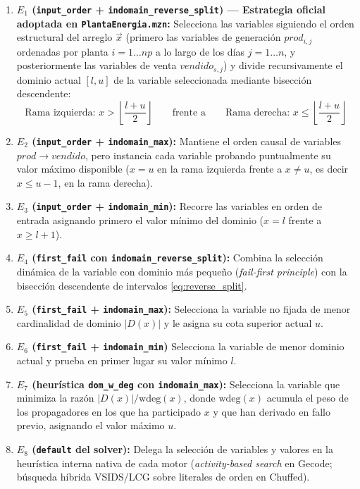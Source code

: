 \begin{enumerate}
    \item \textbf{$E_1$ (\texttt{input\_order} + \texttt{indomain\_reverse\_split}) — Estrategia oficial adoptada en \texttt{PlantaEnergia.mzn}:}
    Selecciona las variables siguiendo el orden estructural del arreglo $\vec{x}$ (primero las variables de generación $prod_{i,j}$ ordenadas por planta $i=1\dots np$ a lo largo de los días $j=1\dots n$, y posteriormente las variables de venta $vendido_{s,j}$) y divide recursivamente el dominio actual $[l, u]$ de la variable seleccionada mediante bisección descendente:
    \begin{equation}
        \text{Rama izquierda: } x > \left\lfloor \frac{l + u}{2} \right\rfloor \qquad \text{frente a} \qquad \text{Rama derecha: } x \le \left\lfloor \frac{l + u}{2} \right\rfloor
        \label{eq:reverse_split}
    \end{equation}

    \item \textbf{$E_2$ (\texttt{input\_order} + \texttt{indomain\_max}):}
    Mantiene el orden causal de variables $prod \to vendido$, pero instancia cada variable probando puntualmente su valor máximo disponible ($x = u$ en la rama izquierda frente a $x \neq u$, es decir $x \le u - 1$, en la rama derecha).

    \item \textbf{$E_3$ (\texttt{input\_order} + \texttt{indomain\_min}):}
    Recorre las variables en orden de entrada asignando primero el valor mínimo del dominio ($x = l$ frente a $x \ge l + 1$).

    \item \textbf{$E_4$ (\texttt{first\_fail} con \texttt{indomain\_reverse\_split}):}
    Combina la selección dinámica de la variable con dominio más pequeño (\emph{fail-first principle}) con la bisección descendente de intervalos \eqref{eq:reverse_split}.

    \item \textbf{$E_5$ (\texttt{first\_fail} + \texttt{indomain\_max}):}
    Selecciona la variable no fijada de menor cardinalidad de dominio $|D(x)|$ y le asigna su cota superior actual $u$.

    \item \textbf{$E_6$ (\texttt{first\_fail} + \texttt{indomain\_min})}
    Selecciona la variable de menor dominio actual y prueba en primer lugar su valor mínimo $l$.

    \item \textbf{$E_7$ (heurística \texttt{dom\_w\_deg} con \texttt{indomain\_max}):}
    Selecciona la variable que minimiza la razón $|D(x)| / \text{wdeg}(x)$, donde $\text{wdeg}(x)$ acumula el peso de los propagadores en los que ha participado $x$ y que han derivado en fallo previo, asignando el valor máximo $u$.

    \item \textbf{$E_8$ (\texttt{default} del solver):}
    Delega la selección de variables y valores en la heurística interna nativa de cada motor (\emph{activity-based search} en Gecode; búsqueda híbrida VSIDS/LCG sobre literales de orden en Chuffed).
\end{enumerate}

